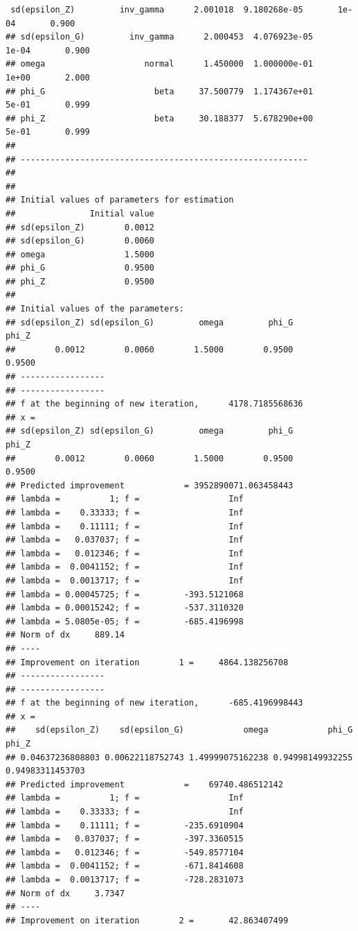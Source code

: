 \documentclass[12pt,a4paper,]{article}
\newcommand{\0}{\mathbf{0}}
\begin{document}
\begin{verbatim}
 sd(epsilon_Z)         inv_gamma      2.001018  9.180268e-05       1e-04       0.900
## sd(epsilon_G)         inv_gamma      2.000453  4.076923e-05       1e-04       0.900
## omega                    normal      1.450000  1.000000e-01       1e+00       2.000
## phi_G                      beta     37.500779  1.174367e+01       5e-01       0.999
## phi_Z                      beta     30.188377  5.678290e+00       5e-01       0.999
## 
## ---------------------------------------------------------- 
## 
## 
## Initial values of parameters for estimation 
##               Initial value
## sd(epsilon_Z)        0.0012
## sd(epsilon_G)        0.0060
## omega                1.5000
## phi_G                0.9500
## phi_Z                0.9500
## 
## Initial values of the parameters:
## sd(epsilon_Z) sd(epsilon_G)         omega         phi_G         phi_Z 
##        0.0012        0.0060        1.5000        0.9500        0.9500 
## -----------------
## -----------------
## f at the beginning of new iteration,      4178.7185568636 
## x =
## sd(epsilon_Z) sd(epsilon_G)         omega         phi_G         phi_Z 
##        0.0012        0.0060        1.5000        0.9500        0.9500 
## Predicted improvement            = 3952890071.063458443
## lambda =          1; f =                  Inf 
## lambda =    0.33333; f =                  Inf 
## lambda =    0.11111; f =                  Inf 
## lambda =   0.037037; f =                  Inf 
## lambda =   0.012346; f =                  Inf 
## lambda =  0.0041152; f =                  Inf 
## lambda =  0.0013717; f =                  Inf 
## lambda = 0.00045725; f =         -393.5121068 
## lambda = 0.00015242; f =         -537.3110320 
## lambda = 5.0805e-05; f =         -685.4196998 
## Norm of dx     889.14
## ----
## Improvement on iteration        1 =     4864.138256708
## -----------------
## -----------------
## f at the beginning of new iteration,      -685.4196998443 
## x =
##    sd(epsilon_Z)    sd(epsilon_G)            omega            phi_G            phi_Z 
## 0.04637236808803 0.00622118752743 1.49999075162238 0.94998149932255 0.94983311453703 
## Predicted improvement            =    69740.486512142
## lambda =          1; f =                  Inf 
## lambda =    0.33333; f =                  Inf 
## lambda =    0.11111; f =         -235.6910904 
## lambda =   0.037037; f =         -397.3360515 
## lambda =   0.012346; f =         -549.8577104 
## lambda =  0.0041152; f =         -671.8414608 
## lambda =  0.0013717; f =         -728.2831073 
## Norm of dx     3.7347
## ----
## Improvement on iteration        2 =       42.863407499

\end{verbatim}
\end{document}
